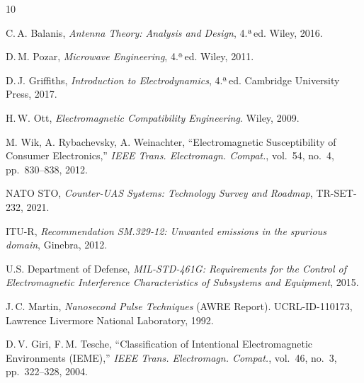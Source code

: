 \documentclass[12pt,a4paper]{article}
\begin{document}
\begin{thebibliography}{10}

  C.\,A. Balanis,
  \textit{Antenna Theory: Analysis and Design}, 4.ª\,ed.
  Wiley, 2016.

  D.\,M. Pozar,
  \textit{Microwave Engineering}, 4.ª\,ed.
  Wiley, 2011.

  D.\,J. Griffiths,
  \textit{Introduction to Electrodynamics}, 4.ª\,ed.
  Cambridge University Press, 2017.

  H.\,W. Ott,
  \textit{Electromagnetic Compatibility Engineering}.
  Wiley, 2009.

  M. Wik, A. Rybachevsky, A. Weinachter,
  ``Electromagnetic Susceptibility of Consumer Electronics,''
  \textit{IEEE Trans. Electromagn. Compat.}, vol.~54, no.~4, pp.~830–838, 2012.

  NATO STO,
  \textit{Counter-UAS Systems: Technology Survey and Roadmap},
  TR-SET-232, 2021.

  ITU-R,
  \textit{Recommendation SM.329-12: Unwanted emissions in the spurious domain},
  Ginebra, 2012.

  U.S. Department of Defense,
  \textit{MIL-STD-461G: Requirements for the Control of Electromagnetic
  Interference Characteristics of Subsystems and Equipment}, 2015.

  J.\,C. Martin,
  \textit{Nanosecond Pulse Techniques} (AWRE Report).
  UCRL-ID-110173, Lawrence Livermore National Laboratory, 1992.

  D.\,V. Giri, F.\,M. Tesche,
  ``Classification of Intentional Electromagnetic Environments (IEME),''
  \textit{IEEE Trans. Electromagn. Compat.}, vol.~46, no.~3, pp.~322–328, 2004.

\end{thebibliography}
\end{document}
